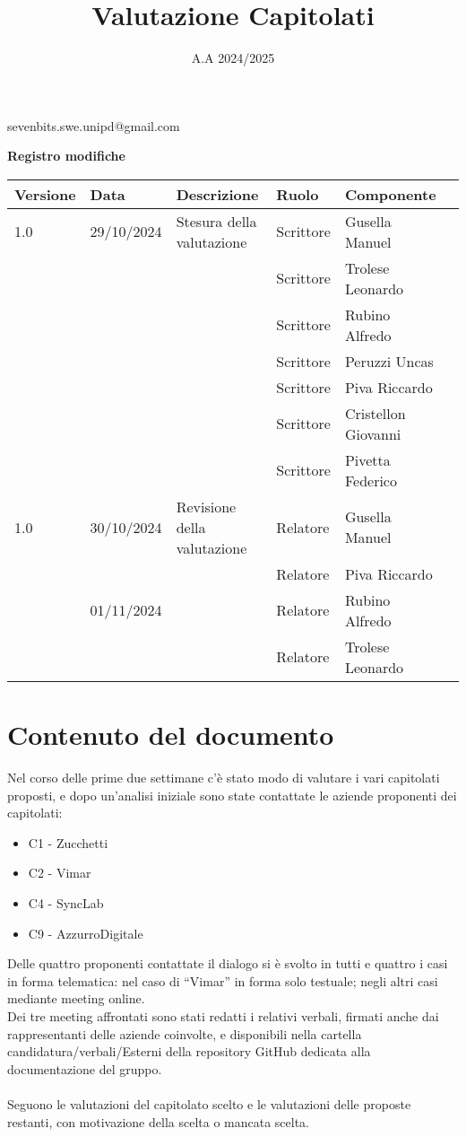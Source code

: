\documentclass[10pt]{article}
\title{Valutazione Capitolati}
\date{A.A 2024/2025}
\begin{document}
\maketitle
\begin{center}

sevenbits.swe.unipd@gmail.com\\
\vspace{2mm}

\textbf{Registro modifiche}\\
\vspace{2mm}
\begin{tabular}{|l|l|l|l|l|l|}
\hline
\textbf{Versione} & \textbf{Data} & \textbf{Descrizione} & \textbf{Ruolo} & \textbf{Componente} \\
\hline
1.0 & 29/10/2024 & Stesura della valutazione & Scrittore & Gusella Manuel\\
& & & Scrittore & Trolese Leonardo\\
& & & Scrittore & Rubino Alfredo\\
& & & Scrittore & Peruzzi Uncas\\
& & & Scrittore & Piva Riccardo\\
& & & Scrittore & Cristellon Giovanni\\
& & & Scrittore & Pivetta Federico\\
\hline
1.0 & 30/10/2024 & Revisione della valutazione & Relatore & Gusella Manuel\\
& & & Relatore & Piva Riccardo\\
& 01/11/2024 & & Relatore & Rubino Alfredo\\
& & & Relatore & Trolese Leonardo\\
\hline
\end{tabular}
\end{center}
\newpage
\tableofcontents
\newpage
\section{Contenuto del documento}
\textbf{}Nel corso delle prime due settimane c'è stato modo di valutare i vari capitolati proposti, e dopo un’analisi iniziale sono state contattate le aziende proponenti dei capitolati:
\begin{itemize}
    \item C1 - Zucchetti
    \item C2 - Vimar
    \item C4 - SyncLab
    \item C9 - AzzurroDigitale
\end{itemize}
\textbf{}Delle quattro proponenti contattate il dialogo si è svolto in tutti e quattro i casi in forma telematica: nel caso di “Vimar” in forma solo testuale; negli altri casi mediante meeting online.\\
Dei tre meeting affrontati sono stati redatti i relativi verbali, firmati anche dai rappresentanti delle aziende coinvolte, e disponibili nella cartella candidatura/verbali/Esterni della repository GitHub dedicata alla documentazione del gruppo.\\
\\
Seguono le valutazioni del capitolato scelto e le valutazioni delle proposte restanti, con motivazione della scelta o mancata scelta.
\end{document}
